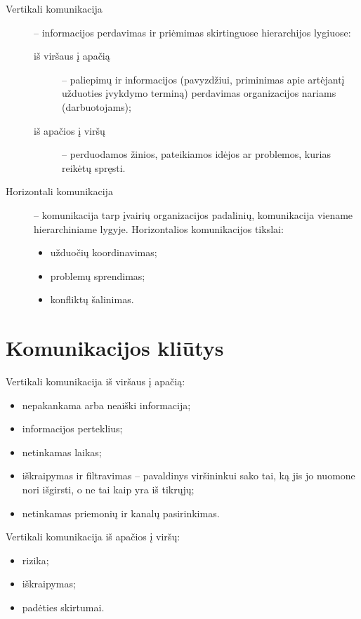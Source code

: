 \begin{description}
  \item[Vertikali komunikacija] – informacijos perdavimas ir priėmimas
    skirtinguose hierarchijos lygiuose:
    \begin{description}
      \item[iš viršaus į apačią] – paliepimų ir informacijos
        (pavyzdžiui, priminimas apie artėjantį užduoties įvykdymo
        terminą) perdavimas organizacijos nariams (darbuotojams);
      \item[iš apačios į viršų] – perduodamos žinios, pateikiamos idėjos
        ar problemos, kurias reikėtų spręsti.
    \end{description}
  \item[Horizontali komunikacija] – komunikacija tarp įvairių organizacijos
    padalinių, komunikacija viename hierarchiniame lygyje. Horizontalios
    komunikacijos tikslai:
    \begin{itemize}
      \item užduočių koordinavimas;
      \item problemų sprendimas;
      \item konfliktų šalinimas.
    \end{itemize}
\end{description}

\section{Komunikacijos kliūtys}

Vertikali komunikacija iš viršaus į apačią:
\begin{itemize}
  \item nepakankama arba neaiški informacija;
  \item informacijos perteklius;
  \item netinkamas laikas;
  \item iškraipymas ir filtravimas – pavaldinys viršininkui sako tai,
    ką jis jo nuomone nori išgirsti, o ne tai kaip yra iš tikrųjų;
  \item netinkamas priemonių ir kanalų pasirinkimas.
\end{itemize}

Vertikali komunikacija iš apačios į viršų:
\begin{itemize}
  \item rizika;
  \item iškraipymas;
  \item padėties skirtumai.
\end{itemize}


